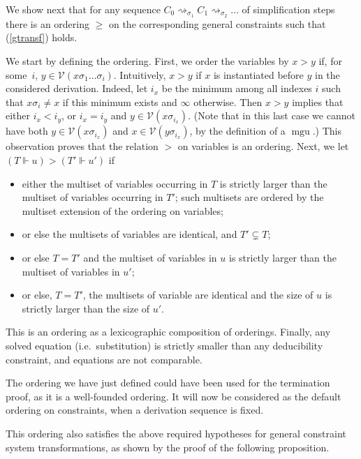 \documentclass[acmtocl,acmnow]{acmtrans2m}
\newcommand{\var}{\mathcal{V}}
\newcommand{\mgu}{\operatorname{mgu}}
\begin{document}
We show next that for any sequence $C_0\rightsquigarrow_{\sigma_1} C_1
\rightsquigarrow_{\sigma_2} \dots$ of simplification steps there is an
ordering $\ge$ on the corresponding general constraints such that
(\ref{gtransf}) holds.

We start by defining the ordering.
First, we order the variables by $x>y$ if, for some~$i$,
$y\in\var(x\sigma_1\dots\sigma_i)$. Intuitively, $x>y$ if $x$ is
instantiated before $y$ in the considered derivation. Indeed, let
$i_x$ be the minimum among all indexes $i$ such that $x\sigma_i\neq x$
if this minimum exists and $\infty$ otherwise. Then $x>y$ implies that
either $i_x<i_y$, or $i_x=i_y$ and $y\in \var(x\sigma_{i_x})$. (Note
that in this last case we cannot have both $y\in \var(x\sigma_{i_x})$
and $x\in \var(y\sigma_{i_x})$, by the definition of a $\mgu$.) This
observation proves that the relation $>$ on variables is an ordering.
Next, we let $(T \Vdash u) > (T'\Vdash u')$ if
\begin{itemize}
\item either the multiset of variables occurring in $T$ is
strictly larger than the multiset of variables occurring in $T'$;
such multisets are ordered by the multiset extension of the ordering on
variables;
\item or else the multisets of variables are identical, and $T'\subsetneq T$;
\item or else $T=T'$ and the multiset of variables in $u$ is strictly
larger than the multiset of variables in $u'$;
\item or else, $T=T'$, the multisets of variable are identical
 and the size of $u$ is strictly larger than the
size of $u'$.
\end{itemize}  
This is an ordering as a lexicographic composition of orderings.
Finally, any solved equation (i.e.~substitution) is strictly smaller
than any deducibility constraint, and equations are not comparable.


The ordering we have just defined could have been used for the
termination proof, as it is a well-founded ordering.  It will now be
considered as the default ordering on constraints, when a derivation
sequence is fixed. 


This ordering also satisfies the above required hypotheses for general
constraint system transformations, as shown by the proof of the
following proposition.
\end{document}
